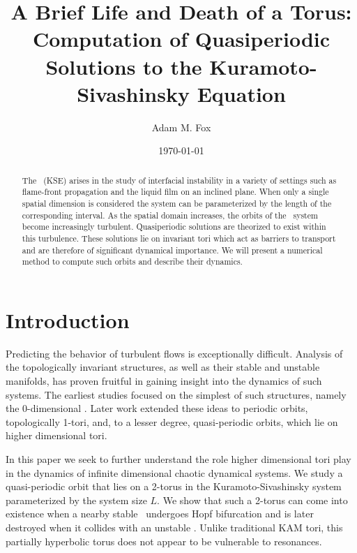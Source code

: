 \documentclass[aip,cha,reprint,
secnumarabic,
nofootinbib, tightenlines,
nobibnotes, showkeys, showpacs,
groupedaddress
]{revtex4-1}
\begin{document}
\title[Life \& Death]
{A Brief Life and Death of a Torus:
Computation of Quasiperiodic Solutions to the Kuramoto-Sivashinsky
Equation}

\author{Adam M. Fox}
\date{\today}

    \begin{abstract}
The \KSe\ (KSE) arises in the study of
interfacial instability in a variety of settings such as flame-front
propagation and the liquid film on an inclined plane.  When only a single
spatial dimension is considered the system can be parameterized by the
length of the corresponding interval.  As the spatial domain increases,
the orbits of the \KS\ system become increasingly
turbulent.  Quasiperiodic solutions are theorized to exist within this
turbulence.  These solutions lie on invariant tori which act as barriers
to transport and are therefore of significant dynamical importance.
We will present a numerical method to compute such orbits and
describe their dynamics.
    \end{abstract}

\maketitle

\section{Introduction}
\label{s:intro}
Predicting the behavior of turbulent flows is exceptionally difficult.
Analysis of the topologically invariant structures, as
well as their stable and unstable manifolds, has proven fruitful in
gaining insight into the dynamics of such
systems.  The earliest studies focused on
the simplest of such structures, namely the 0-dimensional \eqva.  Later
work extended these ideas to periodic orbits,
topologically 1-tori, and, to a lesser degree, quasi-periodic
orbits, which lie on higher dimensional tori.

In this paper we seek to further understand the role higher dimensional
tori play in the dynamics of infinite dimensional chaotic dynamical systems.
We study a quasi-periodic orbit that lies on a 2-torus in the
Kuramoto-Sivashinsky system parameterized by the system size $L$.  We
show that such a 2-torus can come into existence when a nearby stable
\po\ undergoes Hopf bifurcation and is later destroyed when it collides
with an unstable \po.  Unlike traditional KAM tori, this partially
hyperbolic torus does not appear to be vulnerable to resonances.
\end{document}
